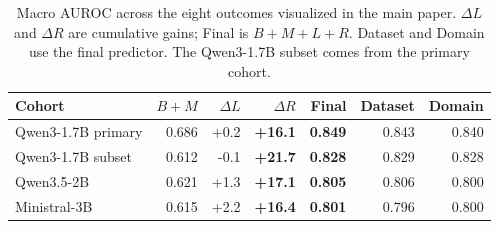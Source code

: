 \begin{table}[t]
\centering
\small
\setlength{\tabcolsep}{1.5pt}
\caption{Macro AUROC across the eight outcomes visualized in the main paper. $\Delta L$ and $\Delta R$ are cumulative gains; Final is $B+M+L+R$. Dataset and Domain use the final predictor. The Qwen3-1.7B subset comes from the primary cohort.}
\label{tab:cross-model-prediction}
\begin{tabular*}{\textwidth}{@{\extracolsep{\fill}}lrrrrrr@{}}
\toprule
Cohort & $B{+}M$ & $\Delta L$ & $\Delta R$ & Final & Dataset & Domain \\
\midrule
Qwen3-1.7B primary & 0.686 & +0.2 & \textbf{+16.1} & \textbf{0.849} & 0.843 & 0.840 \\
Qwen3-1.7B subset & 0.612 & -0.1 & \textbf{+21.7} & \textbf{0.828} & 0.829 & 0.828 \\
Qwen3.5-2B & 0.621 & +1.3 & \textbf{+17.1} & \textbf{0.805} & 0.806 & 0.800 \\
Ministral-3B & 0.615 & +2.2 & \textbf{+16.4} & \textbf{0.801} & 0.796 & 0.800 \\
\bottomrule
\end{tabular*}

\end{table}
